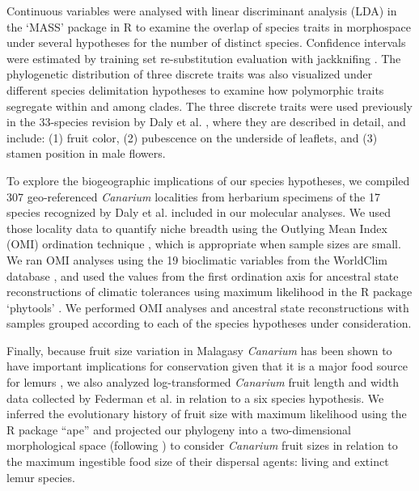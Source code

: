 \documentclass[10pt,letterpaper]{article}
\begin{document}
Continuous variables were analysed with linear discriminant analysis (LDA) in the ‘MASS’ package \cite{ripley_mass:_2017} in R \cite{r_core_team_r:_2014} to examine the overlap of species traits in morphospace under several hypotheses for the number of distinct species. Confidence intervals were estimated by training set re-substitution evaluation with jackknifing \cite{ripley_mass:_2017}. The phylogenetic distribution of three discrete traits was also visualized under different species delimitation hypotheses to examine how polymorphic traits segregate within and among clades. The three discrete traits were used previously in the 33-species revision by Daly et al. 
\cite{daly_revision_2015}, where they are described in detail, and include: (1) fruit color, (2) pubescence on the underside of leaflets, and (3) stamen position in male flowers.

To explore the biogeographic implications of our species hypotheses, we compiled 307 geo-referenced \emph{Canarium} localities from herbarium specimens of the 17 species recognized by Daly et al. \cite{daly_revision_2015} included in our molecular analyses. We used those locality data to quantify niche breadth using the Outlying Mean Index (OMI) ordination technique \cite{doledec_niche_2000}, which is appropriate when sample sizes are small. We ran OMI analyses using the 19 bioclimatic variables from the WorldClim database \cite{hijmans_very_2005}, and used the values from the first ordination axis for ancestral state reconstructions of climatic tolerances using maximum likelihood in the R package ‘phytools’ \cite{revell_phytools:_2012}. We performed OMI analyses and ancestral state reconstructions with samples grouped according to each of the species hypotheses under consideration. 

Finally, because fruit size variation in Malagasy \emph{Canarium} has been shown to have important implications for conservation given that it is a major food source for lemurs \cite{federman_implications_2016}, we also analyzed log-transformed \emph{Canarium} fruit length and width data collected by Federman et al. \cite{federman_implications_2016} in relation to a six species hypothesis. We inferred the evolutionary history of fruit size with maximum likelihood using the R package “ape” \cite{paradis_ape:_2004} and projected our phylogeny into a two-dimensional morphological space (following \cite{federman_implications_2016}) to consider \emph{Canarium} fruit sizes in relation to the maximum ingestible food size of their dispersal agents: living and extinct lemur species.  
\end{document}
